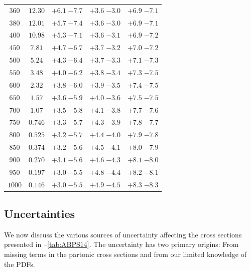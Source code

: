 \begin{table}
\begin{center}
\begin{tabular}{ccccc}
 $360 $&$ 12.30 $& $ {+ 6.1}  \;{- 7.7} $ & $ {+ 3.6}  \;{- 3.0} $ & $ {+ 6.9}  \;{- 7.1} $ \\
 $380 $&$ 12.01 $& $ {+ 5.7}  \;{- 7.4} $ & $ {+ 3.6}  \;{- 3.0} $ & $ {+ 6.9}  \;{- 7.1} $ \\
 $400 $&$ 10.98 $& $ {+ 5.3}  \;{- 7.1} $ & $ {+ 3.6}  \;{- 3.1} $ & $ {+ 6.9}  \;{- 7.2} $ \\
 $450 $&$  7.81 $& $ {+ 4.7}  \;{- 6.7} $ & $ {+ 3.7}  \;{- 3.2} $ & $ {+ 7.0}  \;{- 7.2} $ \\
 $500 $&$  5.24 $& $ {+ 4.3}  \;{- 6.4} $ & $ {+ 3.7}  \;{- 3.3} $ & $ {+ 7.1}  \;{- 7.3} $ \\
 $550 $&$  3.48 $& $ {+ 4.0}  \;{- 6.2} $ & $ {+ 3.8}  \;{- 3.4} $ & $ {+ 7.3}  \;{- 7.5} $ \\
 $600 $&$  2.32 $& $ {+ 3.8}  \;{- 6.0} $ & $ {+ 3.9}  \;{- 3.5} $ & $ {+ 7.4}  \;{- 7.5} $ \\
 $650 $&$  1.57 $& $ {+ 3.6}  \;{- 5.9} $ & $ {+ 4.0}  \;{- 3.6} $ & $ {+ 7.5}  \;{- 7.5} $ \\
 $700 $&$  1.07 $& $ {+ 3.5}  \;{- 5.8} $ & $ {+ 4.1}  \;{- 3.8} $ & $ {+ 7.7}  \;{- 7.6} $ \\
 $750 $&$  0.746 $& $ {+ 3.3}  \;{- 5.7} $ & $ {+ 4.3}  \;{- 3.9} $ & $ {+ 7.8}  \;{- 7.7} $ \\
 $800 $&$  0.525 $& $ {+ 3.2}  \;{- 5.7} $ & $ {+ 4.4}  \;{- 4.0} $ & $ {+ 7.9}  \;{- 7.8} $ \\
 $850 $&$  0.374 $& $ {+ 3.2}  \;{- 5.6} $ & $ {+ 4.5}  \;{- 4.1} $ & $ {+ 8.0}  \;{- 7.9} $ \\
 $900 $&$  0.270 $& $ {+ 3.1}  \;{- 5.6} $ & $ {+ 4.6}  \;{- 4.3} $ & $ {+ 8.1}  \;{- 8.0} $ \\
 $950 $&$  0.197 $& $ {+ 3.0}  \;{- 5.5} $ & $ {+ 4.8}  \;{- 4.4} $ & $ {+ 8.2}  \;{- 8.1} $ \\
$1000 $&$  0.146 $& $ {+ 3.0}  \;{- 5.5} $ & $ {+ 4.9}  \;{- 4.5} $ & $ {+ 8.3}  \;{- 8.3} $ \\


\hline
\end{tabular}
\end{center}
\end{table}



\subsection{Uncertainties}

We now discuss the various sources of uncertainty affecting the 
cross sections presented in --\ref{tab:ABPS14}. The uncertainty has two primary origins:
From missing terms in the partonic cross sections and from our limited
knowledge of the PDFs.

